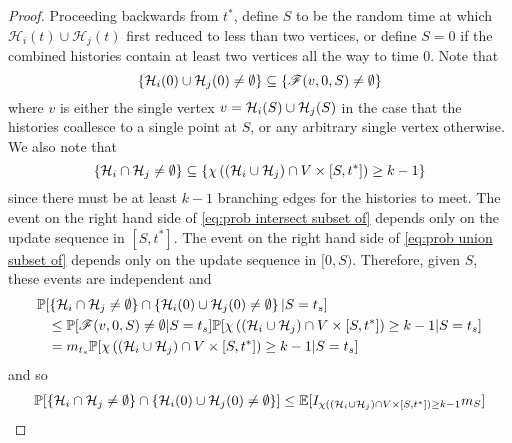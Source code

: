 \begin{proof}
		Proceeding backwards from $t^*$, define $S$ to be the random time at which $\mathcal{H}_i(t) \cup \mathcal{H}_j(t)$ first reduced to less than two vertices, or define $S = 0$ if the combined histories contain at least two vertices all the way to time $0$. 
		Note that
		\begin{equation}
			\label{eq:prob union subset of}
			\{\mathcal{H}_i(0) \cup \mathcal{H}_j(0) \neq \emptyset\} \subseteq \{\mathscr{F}(v, 0, S) \neq \emptyset\}
		\end{equation}
		where $v$ is either the single vertex $v = \mathcal{H}_i(S) \cup\mathcal{H}_j(S)$ in the case that the histories coallesce to a single point at $S$, or any arbitrary single vertex otherwise.
		We also note that
		\begin{equation}
			\label{eq:prob intersect subset of}
			\{\mathcal{H}_i \cap \mathcal{H}_j \neq \emptyset\} \subseteq \{\chi\left((\mathcal{H}_i \cup \mathcal{H}_j)\cap V \times [S, t^*]\right) \geq k - 1\}
		\end{equation}
		since there must be at least $k - 1$ branching edges for the histories to meet. The event on the right hand side of \eqref{eq:prob intersect subset of} depends only on the update sequence in $[S, t^*]$. The event on the right hand side of \eqref{eq:prob union subset of} depends only on the update sequence in $[0, S)$. Therefore, given $S$, these events are independent and
		\begin{align}
			&\mathbb{P}[\left\{\mathcal{H}_i \cap \mathcal{H}_j \neq \emptyset\right\} \cap \left\{\mathcal{H}_i(0) \cup \mathcal{H}_j(0) \neq \emptyset\right\}| S = t_s] \notag \\
			&\phantom{=}\leq \mathbb{P}[\mathscr{F}(v, 0, S) \neq \emptyset | S = t_s] \mathbb{P}[\chi\left((\mathcal{H}_i \cup \mathcal{H}_j)\cap V \times [S, t^*]\right) \geq k - 1 | S = t_s]\\
			&\phantom{=}= m_{t_s}  \mathbb{P}[\chi\left((\mathcal{H}_i \cup \mathcal{H}_j)\cap V \times [S, t^*]\right) \geq k - 1 | S = t_s]
		\end{align}
		and so
		\begin{align}
			\prob[\left\{\mathcal{H}_i \cap \mathcal{H}_j \neq \emptyset\right\} \cap \left\{\mathcal{H}_i(0) \cup \mathcal{H}_j(0) \neq \emptyset\right\}] &\leq \expect[\indicator_{\chi\left((\hist_i \cup \hist_j)\cap V \times [S, t^*]\right) \geq k - 1 }m_S]\\

\end{align}
\end{proof}
